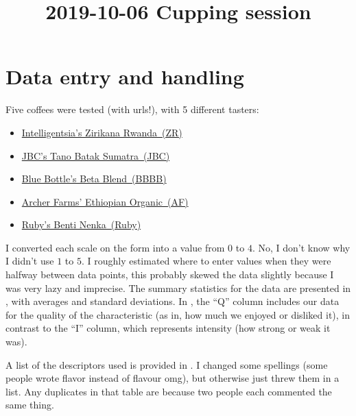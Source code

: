 \documentclass[12pt]{article}
\begin{document}
\title{2019-10-06 Cupping session}
\maketitle
\tableofcontents

\section{Data entry and handling} \label{sec:Data}

Five coffees were tested (with urls!), with 5 different tasters:
\begin{itemize}
	\item \href{https://www.intelligentsiacoffee.com/zirikana-rwanda}{Intelligentsia's Zirikana Rwanda~(ZR)}
	\item \href{https://www.jbccoffeeroasters.com/tano-batak-sumatra}{JBC's Tano Batak Sumatra~(JBC)}
	\item \href{https://bluebottlecoffee.com/store/beta-blend}{Blue Bottle's Beta Blend~(BBBB)}
	\item \href{https://www.target.com/p/organic-ethiopian-yirgacheffe-light-roast-whole-bean-coffee-10oz-archer-farms-153/-/A-50566950}{Archer Farms' Ethiopian Organic~(AF)}
	\item \href{https://rubycoffeeroasters.com/collections/coffee/products/ethiopia-benti-nenka}{Ruby's Benti Nenka~(Ruby)}
\end{itemize}

I converted each scale on the form into a value from $0$ to $4$.
No, I don't know why I didn't use $1$ to $5$.
I roughly estimated where to enter values when they were halfway between data points, this probably skewed the data slightly because I was very lazy and imprecise.
The summary statistics for the data are presented in , with averages and standard deviations.
In , the ``Q'' column includes our data for the quality of the characteristic (as in, how much we enjoyed or disliked it), in contrast to the ``I'' column, which represents intensity (how strong or weak it was).

A list of the descriptors used is provided in .
I changed some spellings (some people wrote flavor instead of flavour omg), but otherwise just threw them in a list.
Any duplicates in that table are because two people each commented the same thing.
\end{document}
